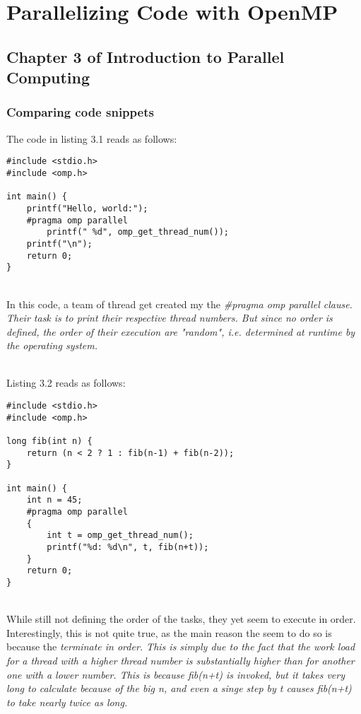 \documentclass[../../main.tex]{subfiles}
\begin{document}
\section{Parallelizing Code with OpenMP}
\subsection{Chapter 3 of Introduction to Parallel Computing}
\subsubsection{Comparing code snippets}
The code in listing 3.1 reads as follows:

\begin{lstlisting}
#include <stdio.h>
#include <omp.h>

int main() {
    printf("Hello, world:");
    #pragma omp parallel
        printf(" %d", omp_get_thread_num());
    printf("\n");
    return 0;
}
\end{lstlisting}

~\\
In this code, a team of thread get created my the \em \#pragma omp parallel \em clause.
Their task is to print their respective thread numbers.
But since no order is defined, the order of their execution are "random", i.e. determined at runtime by the operating system.

~\\
Listing 3.2 reads as follows:

\begin{lstlisting}
#include <stdio.h>
#include <omp.h>

long fib(int n) {
    return (n < 2 ? 1 : fib(n-1) + fib(n-2));
}

int main() {
    int n = 45;
    #pragma omp parallel
    {
        int t = omp_get_thread_num();
        printf("%d: %d\n", t, fib(n+t));
    }
    return 0;
}
\end{lstlisting}

~\\
While still not defining the order of the tasks, they yet seem to execute in order.
Interestingly, this is not quite true, as the main reason the seem to do so is because the \em terminate \em in order.
This is simply due to the fact that the work load for a thread with a higher thread number is substantially higher than for another one with a lower number.
This is because fib(n+t) is invoked, but it takes very long to calculate because of the big n, and even a singe step by t causes fib(n+t) to take nearly twice as long.
\end{document}
